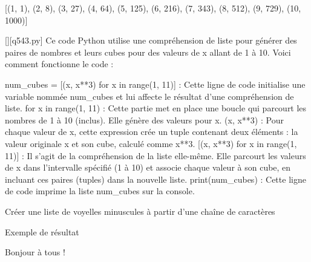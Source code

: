 [(1, 1), (2, 8), (3, 27), (4, 64), (5, 125), (6, 216), (7, 343), (8, 512), (9, 729), (10, 1000)]
        \par
        \begin{solution}
            \renewcommand{\nomfichier}{q543.py}
            \pythonfile{\chemincode \nomfichier}[][\nomfichier]
            Ce code Python utilise une compréhension de liste pour générer des paires de nombres et leurs cubes pour des valeurs de x allant de 1 à 10. Voici comment fonctionne le code :

    num\_cubes = [(x, x**3) for x in range(1, 11)] : Cette ligne de code initialise une variable nommée num\_cubes et lui affecte le résultat d'une compréhension de liste.
        for x in range(1, 11) : Cette partie met en place une boucle qui parcourt les nombres de 1 à 10 (inclus). Elle génère des valeurs pour x.
        (x, x**3) : Pour chaque valeur de x, cette expression crée un tuple contenant deux éléments : la valeur originale x et son cube, calculé comme x**3.
        [(x, x**3) for x in range(1, 11)] : Il s'agit de la compréhension de la liste elle-même. Elle parcourt les valeurs de x dans l'intervalle spécifié (1 à 10) et associe chaque valeur à son cube, en incluant ces paires (tuples) dans la nouvelle liste.
    print(num\_cubes) : Cette ligne de code imprime la liste num\_cubes sur la console.
        \end{solution}
        

        \question
        Créer une liste de voyelles minuscules à partir d'une chaîne de caractères

Exemple de résultat

Bonjour à tous !

